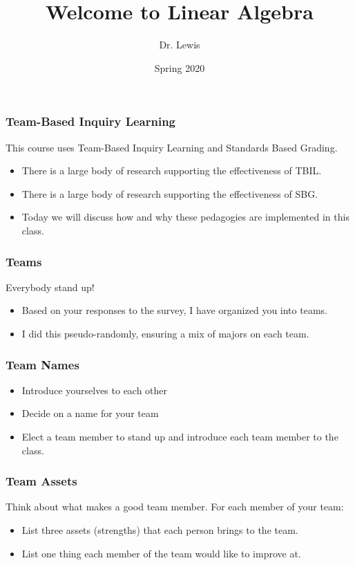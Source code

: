 \documentclass[aspectration=1610]{beamer}
\title{Welcome to Linear Algebra}
\author{Dr. Lewis}
\date{Spring 2020}
\begin{document}
\begin{frame}
\titlepage
\end{frame}

\begin{frame}\frametitle{Team-Based Inquiry Learning}
This course uses Team-Based Inquiry Learning and Standards Based Grading.
\begin{itemize}
	\item There is a large body of research supporting the effectiveness of TBIL.
	\item There is a large body of research supporting the effectiveness of SBG.
	\item Today we will discuss how and why these pedagogies are implemented in this class.
\end{itemize}
  
\end{frame}
 
\begin{frame}\frametitle{Teams}
Everybody stand up!
  
\begin{itemize}
\item Based on your responses to the survey, I have organized you into teams.
\item I did this pseudo-randomly, ensuring a mix of majors on each team.
\end{itemize}
\end{frame}

\begin{frame}\frametitle{Team Names}
\begin{itemize}
\item Introduce yourselves to each other
\item Decide on a name for your team
\item Elect a team member to stand up and introduce each team member to the class.

\end{itemize}
\end{frame}

\begin{frame}\frametitle{Team Assets}
Think about what makes a good team member.  For each member of your team:

\begin{itemize}
\item List three assets (strengths) that each person brings to the team.
\pause \item List one thing each member of the team would like to improve at.
\end{itemize}
\end{frame}
\end{document}
